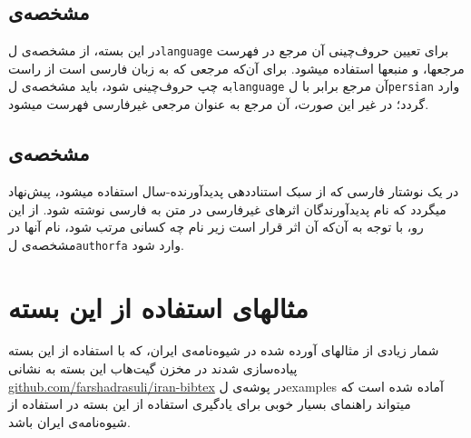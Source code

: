 \documentclass[a4paper,11pt]{article}
\begin{document}
\subsection{مشخصه‌ی }
در این بسته، از مشخصه‌ی \م‌ل{\tt language} برای تعیین حروف‌چینی آن مرجع در فهرست مرجعها، و منبعها استفاده میشود. برای آن‌که مرجعی که به زبان فارسی است از راست به چپ حروف‌چینی شود، باید مشخصه‌ی \م‌ل{\tt language} آن مرجع برابر با \م‌ل{\tt persian} وارد گردد؛ در غیر این صورت، آن مرجع به عنوان مرجعی غیرفارسی فهرست میشود.


\subsection{مشخصه‌ی }
در یک نوشتار فارسی که از سبک استناددهی پدیدآورنده-سال استفاده میشود، پیش‌نهاد میگردد که نام پدیدآورندگان اثرهای غیرفارسی در متن به فارسی نوشته شود. از این رو، با توجه به آن‌که آن اثر قرار است زیر نام چه کسانی مرتب شود، نام آنها در مشخصه‌ی \م‌ل{\tt authorfa} وارد شود.



\section{مثالهای استفاده از این بسته}
شمار زیادی از مثالهای آورده شده در شیوه‌نامه‌ی ایران، که با استفاده از این بسته پیاده‌سازی شدند در مخزن گیت‌هاب این بسته به نشانی
\href{https://github.com/farshadrasuli/iran-bibtex}{github.com/farshadrasuli/iran-bibtex}
در پوشه‌ی \م‌ل{examples} آماده شده است که میتواند راهنمای بسیار خوبی برای یادگیری استفاده از این بسته در استفاده از شیوه‌نامه‌ی ایران باشد.
\end{document}
